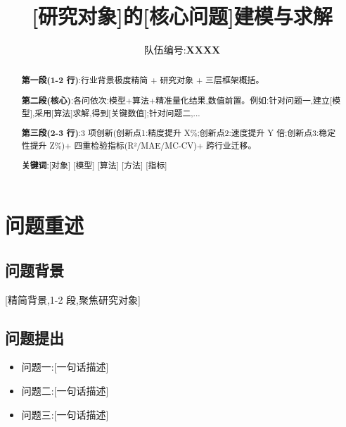 \documentclass[12pt,a4paper]{ctexart}
\title{\textbf{[研究对象]的[核心问题]建模与求解}}
\author{队伍编号:\textbf{XXXX}}
\date{}
\begin{document}
\maketitle

\begin{abstract}
\noindent
\textbf{第一段(1-2 行)}:行业背景极度精简 + 研究对象 + 三层框架概括。

\textbf{第二段(核心)}:各问依次:模型+算法+精准量化结果,数值前置。例如:针对问题一,建立[模型],采用[算法]求解,得到[关键数值];针对问题二,...

\textbf{第三段(2-3 行)}:3 项创新(创新点1:精度提升 X\%;创新点2:速度提升 Y 倍;创新点3:稳定性提升 Z\%)+ 四重检验指标(R²/MAE/MC-CV)+ 跨行业迁移。

\vspace{0.5em}
\noindent\textbf{关键词}:[对象] [模型] [算法] [方法] [指标]
\end{abstract}

\newpage

\newpage

\section{问题重述}

\subsection{问题背景}
[精简背景,1-2 段,聚焦研究对象]

\subsection{问题提出}
\begin{itemize}
  \item 问题一:[一句话描述]
  \item 问题二:[一句话描述]
  \item 问题三:[一句话描述]
\end{itemize}

\end{document}
